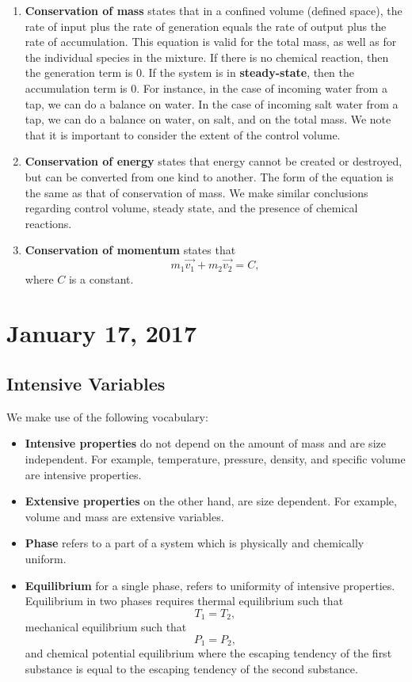 \documentclass[11pt]{article}
\theoremstyle{plain} %
\theoremstyle{definition}
\theoremstyle{example}
\theoremstyle{remark}
\begin{document}
\begin{enumerate}
	\item  \textbf{Conservation of mass} states that in a confined volume (defined space), the rate of input plus the rate of generation equals the rate of output plus the rate of accumulation.  This equation is valid for the total mass, as well as for the individual species in the mixture. If there is no chemical reaction, then the generation term is 0. If the system is in \textbf{steady-state}, then the accumulation term is 0. For instance, in the case of incoming water from a tap, we can do a balance on water. In the case of incoming salt water from a tap, we can do a balance on water, on salt,  and on the total mass. We note that it is important to consider the extent of the control volume. 
	\item \textbf{Conservation of energy} states that energy cannot be created or destroyed, but can be converted from one kind to another. The form of the equation is the same as that of conservation of mass. We make similar conclusions regarding control volume, steady state, and the presence of chemical reactions. 
	\item \textbf{Conservation of momentum} states that
	$$m_1\vec{v_1} + m_2\vec{v_2} = C,$$
	where $C$ is a constant. 
\end{enumerate}


\section{January 17, 2017}
\subsection{Intensive Variables}

We make use of the following vocabulary:

\begin{itemize}
	\item  \textbf{Intensive properties} do not depend on the amount of mass and are size independent. For example, temperature, pressure, density, and specific volume are intensive properties. 
	\item \textbf{Extensive properties} on the other hand, are size dependent. For example, volume and mass are extensive variables.
	 \item \textbf{Phase} refers to a part of a system which is physically and chemically uniform. 

	\item \textbf{Equilibrium} for a single phase, refers to uniformity of intensive properties. Equilibrium in two phases requires thermal equilibrium such that 
	$$T_1=T_2,$$ mechanical equilibrium such that $$P_1 = P_2,$$ and chemical potential equilibrium where the escaping tendency of the first substance is equal to the escaping tendency of the second substance. 
	\end{itemize}
\end{document}
